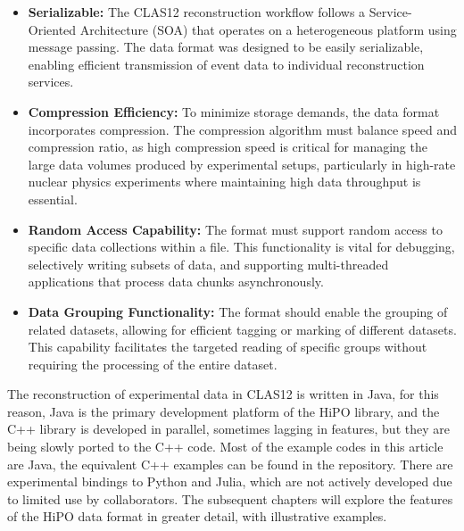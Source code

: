 \begin{itemize}
\item {\bf Serializable:} The CLAS12 reconstruction workflow follows a Service-Oriented Architecture (SOA) that operates on a heterogeneous platform using message passing. The data format was designed to be easily serializable, enabling efficient transmission of event data to individual reconstruction services.
\item {\bf Compression Efficiency:} To minimize storage demands, the data format incorporates compression. The compression algorithm must balance speed and compression ratio, as high compression speed is critical for managing the large data volumes produced by experimental setups, particularly in high-rate nuclear physics experiments where maintaining high data throughput is essential.
\item {\bf Random Access Capability:} The format must support random access to specific data collections within a file. This functionality is vital for debugging, selectively writing subsets of data, and supporting multi-threaded applications that process data chunks asynchronously.
\item {\bf Data Grouping Functionality:} The format should enable the grouping of related datasets, allowing for efficient tagging or marking of different datasets. This capability facilitates the targeted reading of specific groups without requiring the processing of the entire dataset.
\end{itemize}

The reconstruction of experimental data in CLAS12 is written in Java, for this reason, Java is the primary development platform of the HiPO library, and the C++ library is developed in parallel, sometimes lagging in features, but they are being slowly ported to the C++ code. Most of the example codes in this article are Java, the equivalent C++ examples can be found in the repository.
There are experimental bindings to Python and Julia, which are not actively developed due to limited use by collaborators.
The subsequent chapters will explore the features of the HiPO data format in greater detail, with illustrative examples.
